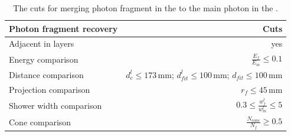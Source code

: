 \begin{table}[htbp]
\centering

\smallskip

\begin{tabular}{l r }
\hline
\hline
Photon fragment recovery&  Cuts\\
\hline
\multicolumn{1}{L{0.3\textwidth}}{Adjacent in layers} & \multicolumn{1}{R{0.6\textwidth}}{yes} \\
\multicolumn{1}{L{0.3\textwidth}}{Energy comparison} & \multicolumn{1}{R{0.6\textwidth}}{$ \frac{E_f}{E_m} \leqslant 0.1$} \\
\multicolumn{1}{L{0.3\textwidth}}{Distance comparison} & \multicolumn{1}{R{0.6\textwidth}}{$d^l_c \leqslant 173\,\text{mm}$; $d^l_{fit} \leqslant 100\,\text{mm}$; $d_{fit} \leqslant 100\,\text{mm}$} \\
\multicolumn{1}{L{0.3\textwidth}}{Projection comparison} & \multicolumn{1}{R{0.6\textwidth}}{$ r_f \leqslant 45\,\text{mm}$} \\
\multicolumn{1}{L{0.3\textwidth}}{Shower width comparison} & \multicolumn{1}{R{0.6\textwidth}}{$  0.3 \leqslant \frac{w^l_f}{w^l_m} \leqslant 5$} \\
\multicolumn{1}{L{0.3\textwidth}}{Cone comparison} & \multicolumn{1}{R{0.6\textwidth}}{$ \frac{N_{cone}}{N_f} \geqslant 0.5$} \\

\hline
\hline
\end{tabular}

\caption[Cuts for merging high energy photon fragment in the \HCAL.]%
{The cuts for merging photon fragment in the \HCAL to the main photon in the \ECAL. }

\label{tab:photonHighEnergyFragCuts}
\end{table}


